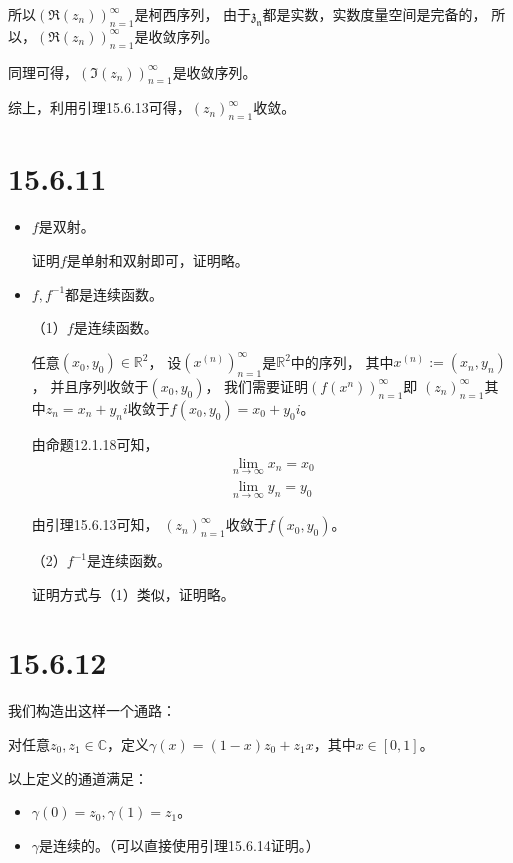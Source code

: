 \documentclass{article}
\begin{document}
所以$(\mathfrak{R}(z_n))_{n = 1}^\infty$是柯西序列，
由于$\mathfrak{z_n}$都是实数，实数度量空间是完备的，
所以，$(\mathfrak{R}(z_n))_{n = 1}^\infty$是收敛序列。

同理可得，$(\mathfrak{I}(z_n))_{n = 1}^\infty$是收敛序列。

综上，利用引理15.6.13可得，$(z_n)_{n = 1}^\infty$收敛。

\section*{15.6.11}

\begin{itemize}
  \item $f$是双射。

        证明$f$是单射和双射即可，证明略。

  \item $f, f^{-1}$都是连续函数。

        （1）$f$是连续函数。

        任意$(x_0, y_0) \in \mathbb{R}^2$，
        设$(x^{(n)})_{n = 1}^\infty$是$\mathbb{R}^2$中的序列，
        其中$x^{(n)} := (x_n, y_n)$，
        并且序列收敛于$(x_0, y_0)$，
        我们需要证明$(f(x^{n}))_{n = 1}^\infty$即
        $(z_n)_{n = 1}^\infty$其中$z_n = x_n + y_n i$收敛于$f(x_0, y_0) = x_0 + y_0 i$。

        由命题12.1.18可知，
        \begin{align*}
          \lim\limits_{n \to \infty} x_n = x_0 \\
          \lim\limits_{n \to \infty} y_n = y_0
        \end{align*}

        由引理15.6.13可知，
        $(z_n)_{n = 1}^\infty$收敛于$f(x_0, y_0)$。

        （2）$f^{-1}$是连续函数。

        证明方式与（1）类似，证明略。

\end{itemize}


\section*{15.6.12}

我们构造出这样一个通路：

对任意$z_0, z_1 \in \mathbb{C}$，定义$\gamma (x) = (1 - x)z_0 + z_1 x$，其中$x \in [0, 1]$。

以上定义的通道满足：

\begin{itemize}
  \item $\gamma (0) = z_0, \gamma (1) = z_1$。
  \item $\gamma$是连续的。（可以直接使用引理15.6.14证明。）
\end{itemize}
\end{document}
